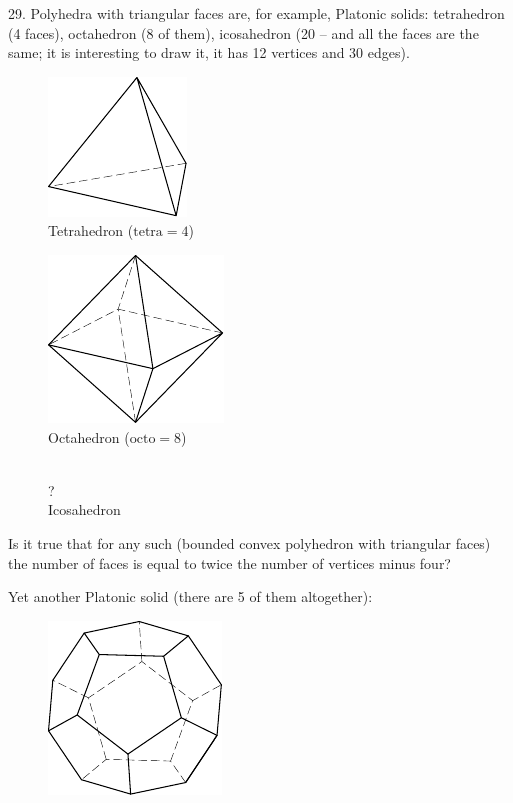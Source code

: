 \begin{problem}{29.}
	Polyhedra with triangular faces are, for example, Platonic solids: tetrahedron (4 faces),
	octahedron (8 of them), icosahedron (20 -- and all the faces are the same; it is interesting to draw it,
	it has 12 vertices and 30 edges).
	\begin{figure}
		\footnotesize
		\null\hfill
		\parbox{0.3\linewidth}{\centering\includegraphics{resources/taskbook-131}\\Tetrahedron ($\text{tetra}= 4$)}
		\hfill
		\parbox{0.3\linewidth}{\centering\includegraphics{resources/taskbook-132}\\Octahedron ($\text{octo}= 8$)}
		\hfill\null\\
		{\Huge ?}\\Icosahedron
	\end{figure}
	Is it true that for any such (bounded convex polyhedron with triangular faces) the number of faces is
	equal to twice the number of vertices minus four?


	Yet another Platonic solid (there are 5 of them altogether):
	\begin{figure}
		\includegraphics{resources/taskbook-14}
	\end{figure}
\end{problem}

